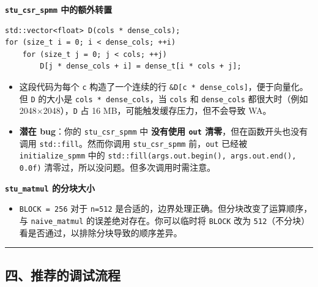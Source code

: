 \documentclass[11pt, a4paper]{article}
\begin{document}
\begin{aibox}
\textbf{\texttt{stu\_csr\_spmm} 中的额外转置}
\begin{tcolorbox}[colback=white,colframe=gray!50!white,boxrule=0.5pt,arc=2pt,left=5pt,right=5pt,top=5pt,bottom=5pt]
\begin{verbatim}
std::vector<float> D(cols * dense_cols);
for (size_t i = 0; i < dense_cols; ++i)
    for (size_t j = 0; j < cols; ++j)
        D[j * dense_cols + i] = dense_t[i * cols + j];
\end{verbatim}
\end{tcolorbox}
\begin{itemize}
    \item 这段代码为每个 \texttt{c} 构造了一个连续的行 \texttt{\&D[c * dense\_cols]}，便于向量化。但 \texttt{D} 的大小是 \texttt{cols * dense\_cols}，当 \texttt{cols} 和 \texttt{dense\_cols} 都很大时（例如 2048$\times$2048），\texttt{D} 占 16 MB，可能触发缓存压力，但不会导致 WA。
    \item \textbf{潜在 bug}：你的 \texttt{stu\_csr\_spmm} 中 \textbf{没有使用 \texttt{out} 清零}，但在函数开头也没有调用 \texttt{std::fill}。然而你调用 \texttt{stu\_csr\_spmm} 前，\texttt{out} 已经被 \texttt{initialize\_spmm} 中的 \texttt{std::fill(args.out.begin(), args.out.end(), 0.0f)} 清零过，所以没问题。但多次调用时需注意。
\end{itemize}

\vspace{0.5em}
\textbf{\texttt{stu\_matmul} 的分块大小}
\begin{itemize}
    \item \texttt{BLOCK = 256} 对于 \texttt{n=512} 是合适的，边界处理正确。但分块改变了运算顺序，与 \texttt{naive\_matmul} 的误差绝对存在。你可以临时将 \texttt{BLOCK} 改为 \texttt{512}（不分块）看是否通过，以排除分块导致的顺序差异。
\end{itemize}

\begin{center}\rule{\textwidth}{0.4pt}\end{center}

\subsection*{四、推荐的调试流程}


\end{aibox}
\end{document}
